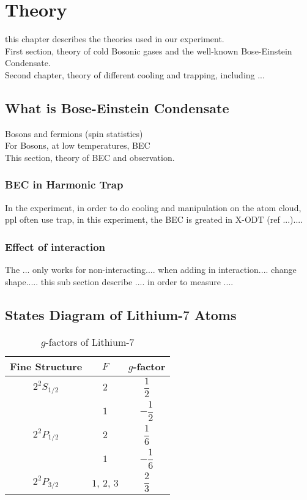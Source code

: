 \chapter{Theory}
this chapter describes the theories used in our experiment.\\
First section, theory of cold Bosonic gases and the well-known Bose-Einstein Condensate.\\
Second chapter, theory of different cooling and trapping, including ...\\

\section{What is Bose-Einstein Condensate}\label{ch1:bec}

Bosons and fermions (spin statistics\cite{spin-statistics1,spin-statistics2})\\
For Bosons, at low temperatures, BEC\\
This section, theory of BEC and observation.

\subsection{BEC in Harmonic Trap}

In the experiment, in order to do cooling and manipulation on the atom cloud, ppl often use trap, in this experiment, the BEC is greated in X-ODT (ref ...)....

\subsection{Effect of interaction}

The ... only works for non-interacting.... when adding in interaction.... change shape..... this sub section describe .... in order to measure ....

\section{States Diagram of Lithium-$7$ Atoms}

\begin{table}
\caption{$g$-factors of Lithium-$7$}
\label{li7:g-factors}
\begin{center}
\begin{tabular}{|c|c|c|}\hline
Fine Structure & $F$ & $g$-factor \\\hline
$2^2S_{1/2}$ & $2$ & $\dfrac 12$ \\\cline{2-3}
 & $1$ & $-\dfrac 12$ \\\hline
$2^2P_{1/2}$ & $2$ & $\dfrac 16$ \\\cline{2-3}
 & $1$ & $-\dfrac 16$ \\\hline
$2^2P_{3/2}$ & $1$, $2$, $3$ & $\dfrac 23$ \\\hline
\end{tabular}
\end{center}
\end{table}

